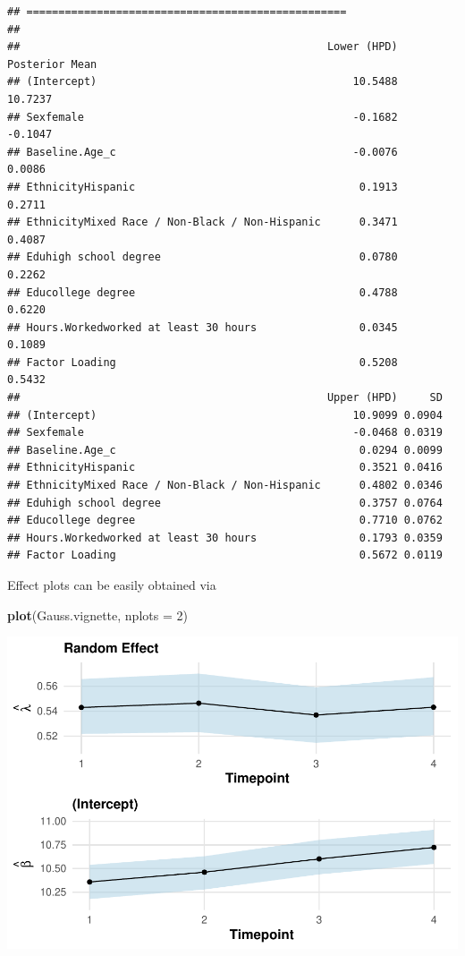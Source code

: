 \documentclass[a4paper, preprint, 3p,
authoryear]{elsarticle} %
\newenvironment{Shaded}{\begin{snugshade}}{\end{snugshade}}
\newcommand{\AttributeTok}[1]{\textcolor[rgb]{0.13,0.29,0.53}{#1}}
\newcommand{\DecValTok}[1]{\textcolor[rgb]{0.00,0.00,0.81}{#1}}
\newcommand{\FunctionTok}[1]{\textcolor[rgb]{0.13,0.29,0.53}{\textbf{#1}}}
\newcommand{\NormalTok}[1]{#1}
\begin{document}
\begin{verbatim}
## ==================================================
## 
##                                                Lower (HPD) Posterior Mean
## (Intercept)                                        10.5488        10.7237
## Sexfemale                                          -0.1682        -0.1047
## Baseline.Age_c                                     -0.0076         0.0086
## EthnicityHispanic                                   0.1913         0.2711
## EthnicityMixed Race / Non-Black / Non-Hispanic      0.3471         0.4087
## Eduhigh school degree                               0.0780         0.2262
## Educollege degree                                   0.4788         0.6220
## Hours.Workedworked at least 30 hours                0.0345         0.1089
## Factor Loading                                      0.5208         0.5432
##                                                Upper (HPD)     SD
## (Intercept)                                        10.9099 0.0904
## Sexfemale                                          -0.0468 0.0319
## Baseline.Age_c                                      0.0294 0.0099
## EthnicityHispanic                                   0.3521 0.0416
## EthnicityMixed Race / Non-Black / Non-Hispanic      0.4802 0.0346
## Eduhigh school degree                               0.3757 0.0764
## Educollege degree                                   0.7710 0.0762
## Hours.Workedworked at least 30 hours                0.1793 0.0359
## Factor Loading                                      0.5672 0.0119
\end{verbatim}

Effect plots can be easily obtained via

\begin{Shaded}
\begin{Highlighting}[]
\FunctionTok{plot}\NormalTok{(Gauss.vignette, }\AttributeTok{nplots =} \DecValTok{2}\NormalTok{)}
\end{Highlighting}
\end{Shaded}

\includegraphics[width=0.7\linewidth]{Vignette-for-panelTVP_files/figure-latex/myplot-1}
\end{document}

